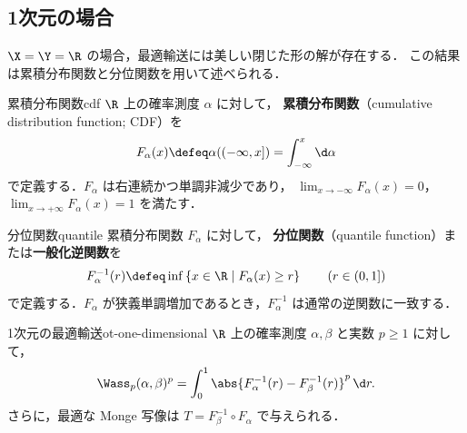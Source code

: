 \subsection{1次元の場合}
\label{subsec:one-dimensional}

$\X = \Y = \R$ の場合，最適輸送には美しい閉じた形の解が存在する．
この結果は累積分布関数と分位関数を用いて述べられる．

\begin{definition}{累積分布関数}{cdf}
  $\R$ 上の確率測度 $\alpha$ に対して，
  \textbf{累積分布関数}（cumulative distribution function; CDF）を
  \[
    F_\alpha(x) \defeq \alpha((-\infty, x]) = \int_{-\infty}^x \d\alpha
  \]
  で定義する．$F_\alpha$ は右連続かつ単調非減少であり，
  $\lim_{x \to -\infty} F_\alpha(x) = 0$，$\lim_{x \to +\infty} F_\alpha(x) = 1$ を満たす．
\end{definition}

\begin{definition}{分位関数}{quantile}
  累積分布関数 $F_\alpha$ に対して，
  \textbf{分位関数}（quantile function）または\textbf{一般化逆関数}を
  \[
    F_\alpha^{-1}(r) \defeq \inf \left\{ x \in \R \;\middle|\; F_\alpha(x) \geq r \right\}
    \qquad (r \in (0, 1])
  \]
  で定義する．$F_\alpha$ が狭義単調増加であるとき，$F_\alpha^{-1}$ は通常の逆関数に一致する．
\end{definition}

\begin{theorem}{1次元の最適輸送}{ot-one-dimensional}
  $\R$ 上の確率測度 $\alpha, \beta$ と実数 $p \geq 1$ に対して，
  \[
    \Wass_p(\alpha, \beta)^p
    = \int_0^1 \abs{F_\alpha^{-1}(r) - F_\beta^{-1}(r)}^p \, \d r.
  \]
  さらに，最適な Monge 写像は $T = F_\beta^{-1} \circ F_\alpha$ で与えられる．
\end{theorem}

